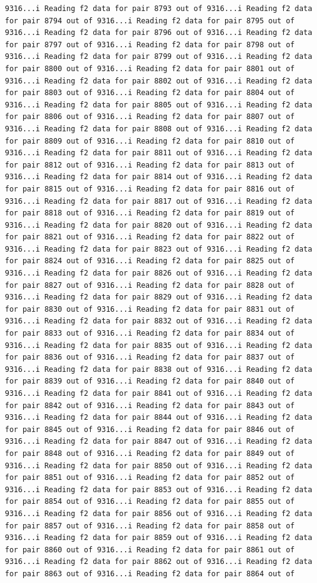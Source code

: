 \documentclass[
]{article}
\begin{document}
\begin{verbatim}
9316...i Reading f2 data for pair 8793 out of 9316...i Reading f2 data for pair 8794 out of 9316...i Reading f2 data for pair 8795 out of 9316...i Reading f2 data for pair 8796 out of 9316...i Reading f2 data for pair 8797 out of 9316...i Reading f2 data for pair 8798 out of 9316...i Reading f2 data for pair 8799 out of 9316...i Reading f2 data for pair 8800 out of 9316...i Reading f2 data for pair 8801 out of 9316...i Reading f2 data for pair 8802 out of 9316...i Reading f2 data for pair 8803 out of 9316...i Reading f2 data for pair 8804 out of 9316...i Reading f2 data for pair 8805 out of 9316...i Reading f2 data for pair 8806 out of 9316...i Reading f2 data for pair 8807 out of 9316...i Reading f2 data for pair 8808 out of 9316...i Reading f2 data for pair 8809 out of 9316...i Reading f2 data for pair 8810 out of 9316...i Reading f2 data for pair 8811 out of 9316...i Reading f2 data for pair 8812 out of 9316...i Reading f2 data for pair 8813 out of 9316...i Reading f2 data for pair 8814 out of 9316...i Reading f2 data for pair 8815 out of 9316...i Reading f2 data for pair 8816 out of 9316...i Reading f2 data for pair 8817 out of 9316...i Reading f2 data for pair 8818 out of 9316...i Reading f2 data for pair 8819 out of 9316...i Reading f2 data for pair 8820 out of 9316...i Reading f2 data for pair 8821 out of 9316...i Reading f2 data for pair 8822 out of 9316...i Reading f2 data for pair 8823 out of 9316...i Reading f2 data for pair 8824 out of 9316...i Reading f2 data for pair 8825 out of 9316...i Reading f2 data for pair 8826 out of 9316...i Reading f2 data for pair 8827 out of 9316...i Reading f2 data for pair 8828 out of 9316...i Reading f2 data for pair 8829 out of 9316...i Reading f2 data for pair 8830 out of 9316...i Reading f2 data for pair 8831 out of 9316...i Reading f2 data for pair 8832 out of 9316...i Reading f2 data for pair 8833 out of 9316...i Reading f2 data for pair 8834 out of 9316...i Reading f2 data for pair 8835 out of 9316...i Reading f2 data for pair 8836 out of 9316...i Reading f2 data for pair 8837 out of 9316...i Reading f2 data for pair 8838 out of 9316...i Reading f2 data for pair 8839 out of 9316...i Reading f2 data for pair 8840 out of 9316...i Reading f2 data for pair 8841 out of 9316...i Reading f2 data for pair 8842 out of 9316...i Reading f2 data for pair 8843 out of 9316...i Reading f2 data for pair 8844 out of 9316...i Reading f2 data for pair 8845 out of 9316...i Reading f2 data for pair 8846 out of 9316...i Reading f2 data for pair 8847 out of 9316...i Reading f2 data for pair 8848 out of 9316...i Reading f2 data for pair 8849 out of 9316...i Reading f2 data for pair 8850 out of 9316...i Reading f2 data for pair 8851 out of 9316...i Reading f2 data for pair 8852 out of 9316...i Reading f2 data for pair 8853 out of 9316...i Reading f2 data for pair 8854 out of 9316...i Reading f2 data for pair 8855 out of 9316...i Reading f2 data for pair 8856 out of 9316...i Reading f2 data for pair 8857 out of 9316...i Reading f2 data for pair 8858 out of 9316...i Reading f2 data for pair 8859 out of 9316...i Reading f2 data for pair 8860 out of 9316...i Reading f2 data for pair 8861 out of 9316...i Reading f2 data for pair 8862 out of 9316...i Reading f2 data for pair 8863 out of 9316...i Reading f2 data for pair 8864 out of 
\end{verbatim}
\end{document}
